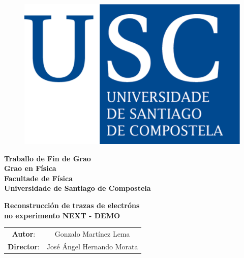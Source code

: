 \documentclass[a4paper,12pt]{article}
\begin{document}
\begin{titlepage}

\begin{figure}[h!]
\centering
\includegraphics[scale=0.2]{logo_usc.pdf}
\end{figure}
\vspace{2cm}

\begin{center}
{\large\bf
Traballo de Fin de Grao \\
Grao en Física \\
Facultade de Física \\
Universidade de Santiago de Compostela}
\end{center}


\vspace{2cm}
\noindent
{\begin{center}\huge\bf Reconstrucción de trazas de electróns \\no experimento  NEXT - DEMO \end{center}}

\vspace{3cm}
\begin{center}
\begin{tabular}{cc}
{\Large{\bf Autor}}: & \large{Gonzalo Martínez Lema}\\
{\Large{\bf Director}}: & \large{José Ángel Hernando Morata}
\end{tabular}
\end{center}

\vspace{2cm}


\end{titlepage}

\newpage
\thispagestyle{empty} 
\tableofcontents
\newpage
\end{document}
